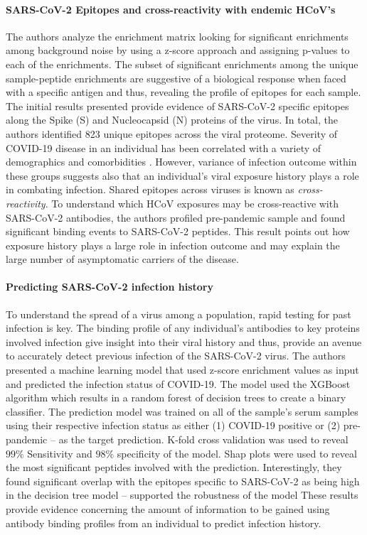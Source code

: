 \documentclass{article}
\begin{document}
\paragraph{SARS-CoV-2 Epitopes and cross-reactivity with endemic HCoV's}
The authors analyze the enrichment matrix looking for significant enrichments among background noise by using a z-score approach and assigning p-values to each of the enrichments.
The subset of significant enrichments among the unique sample-peptide enrichments are suggestive of a biological response when faced with a specific antigen and thus, revealing the profile of epitopes for each sample.
The initial results presented provide evidence of SARS-CoV-2 specific epitopes along the Spike (S) and Nucleocapsid (N) proteins of the virus.
In total, the authors identified 823 unique epitopes across the viral proteome.
Severity of COVID-19 disease in an individual has been correlated with a variety of demographics and comorbidities \citep{Yuki2020}.
However, variance of infection outcome within these groups suggests also that an individual's viral exposure history plays a role in combating infection.
Shared epitopes across viruses is known as \textit{cross-reactivity}.
To understand which HCoV exposures may be cross-reactive with SARS-CoV-2 antibodies, the authors profiled pre-pandemic sample and found significant binding events to SARS-CoV-2 peptides.
This result points out how exposure history plays a large role in infection outcome and may explain the large number of asymptomatic carriers of the disease. 

\paragraph{Predicting SARS-CoV-2 infection history} 
To understand the spread of a virus among a population, rapid testing for past infection is key.
The binding profile of any individual's antibodies to key proteins involved infection give insight into their viral history and thus, provide an avenue to accurately detect previous infection of the SARS-CoV-2 virus.
The authors presented a machine learning model that used z-score enrichment values as input and predicted the infection status of COVID-19.
The model used the XGBoost algorithm which results in a random forest of decision trees to create a binary classifier.
The prediction model was trained on all of the sample's serum samples using their respective infection status as either (1) COVID-19 positive or (2) pre-pandemic -- as the target prediction.
K-fold cross validation was used to reveal $99\%$ Sensitivity and $98\%$ specificity of the model.
Shap plots were used to reveal the most significant peptides involved with the prediction.
Interestingly, they found significant overlap with the epitopes specific to SARS-CoV-2 as being high in the decision tree model -- supported the robustness of the model
These results provide evidence concerning the amount of information to be gained using antibody binding profiles from an individual to predict infection history.
\end{document}
